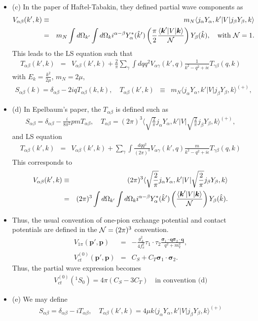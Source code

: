 \documentclass[10pt]{book}
\def\bm{\boldsymbol}
\newcommand{\bea}{\begin{eqnarray}}
\newcommand{\eea}{\end{eqnarray}}
\newcommand{\no}{\nonumber \\}
\def\vs{{\bm \sigma}}
\def\vp{{\bm p}}
\def\vq{{\bm q}}
\def\vk{{\bm k}}
\def\la{\langle}
\def\ra{\rangle}
\begin{document}
\begin{itemize}
      
\item{(c)} In the paper of Haftel-Tabakin, they defined partial wave components as
  \bea 
  V_{\alpha\beta}(k',k) &\equiv& 
         m_N \la j_{\alpha} Y_{\alpha},k'|V| j_{\beta} Y_{\beta},k\ra
    \no 
    &=&  m_N
         \int d\Omega_{k'}\int d\Omega_k  i^{\alpha-\beta} 
        Y^*_{\alpha}(\hat{k}')\left(\frac{\pi}{2}\frac{\la \vk'|V|\vk\ra}{\cal N}\right) 
        Y_{\beta}(\hat{k}), \quad \mbox{with } {\cal N}=1.
  \eea   
  This leads to the LS equation such that
  \bea 
  T_{\alpha\beta}(k',k)&=&V_{\alpha\beta}(k',k) +\frac{2}{\pi}
  \sum_{\gamma}\int dq q^2  V_{\alpha\gamma}(k',q)
    \frac{1}{k^2-q^2+i\epsilon}  
    T_{\gamma\beta}(q,k)
  \eea  
  with $E_k=\frac{k^2}{2\mu}$, $m_N=2\mu$, 
  \bea 
  S_{\alpha\beta}(k)=\delta_{\alpha\beta}-2i q T_{\alpha\beta}(k,k),
  \quad 
  T_{\alpha\beta}(k',k) &\equiv& 
  m_N \la j_{\alpha} Y_{\alpha},k'|V| j_{\beta} Y_{\beta},k\ra^{(+)},
  \eea 
\item{(d)} In Epelbaum's paper, the $T_{\alpha\beta}$ is defined such as
  \bea 
  S_{\alpha\beta}=\delta_{\alpha\beta}-\frac{i}{8\pi^2}pm T_{\alpha\beta},
  \quad 
  T_{\alpha\beta}=(2\pi)^3\la \sqrt{\frac{2}{\pi}}j_{\alpha} Y_{\alpha},k'|
    V|\sqrt{\frac{2}{\pi}} j_{\beta} Y_{\beta},k\ra^{(+)}, 
  \eea  
  and LS equation
  \bea 
    T_{\alpha\beta}(k',k)&=&V_{\alpha\beta}(k',k) +
    \sum_{\gamma}\int \frac{dq q^2}{(2\pi)^3}  V_{\alpha\gamma}(k',q)
      \frac{m}{k^2-q^2+i\epsilon}  
      T_{\gamma\beta}(q,k)
  \eea 
  This corresponds to 
  \bea 
  V_{\alpha\beta}(k',k) &\equiv& 
  (2\pi)^3\la \sqrt{\frac{2}{\pi}}j_{\alpha} Y_{\alpha},k'|
      V|\sqrt{\frac{2}{\pi}} j_{\beta} Y_{\beta},k\ra
   \no &=&   
       (2\pi)^3 \int d\Omega_{k'}\int d\Omega_k  i^{\alpha-\beta} 
            Y^*_{\alpha}(\hat{k}')\left(\frac{\la \vk'|V|\vk\ra}{\cal N}\right) 
            Y_{\beta}(\hat{k}). 
  \eea 
\item Thus, the usual convention of one-pion exchange  potential and 
      contact potentials are defined in the ${\cal N}=(2\pi)^3$ convention.
      \bea 
      V_{1\pi}(\vp',\vp)&=&-\frac{g_A^2}{4f_\pi^2}\tau_1\cdot\tau_2
         \frac{\vs_1\cdot\vq\vs_2\cdot\vq}{q^2+m_\pi^2},\no 
      V_{ct}^{(0)}(\vp',\vp)&=&C_S+C_T\vs_1\cdot\vs_2.   
      \eea 
      Thus, the partial wave expression becomes
      \bea 
      V_{ct}^{(0)}(^1S_0)=4\pi(C_S-3C_T) \quad \mbox{in convention (d)}
      \eea 
\item{(e)} We may define    
\bea 
S_{\alpha\beta}=\delta_{\alpha\beta}-i T_{\alpha\beta},
 \quad T_{\alpha\beta}(k',k)=4\mu k \la j_{\alpha} Y_{\alpha},k'|
     V|j_{\beta} Y_{\beta},k\ra^{(+)}
\eea 


\end{itemize}
\end{document}
